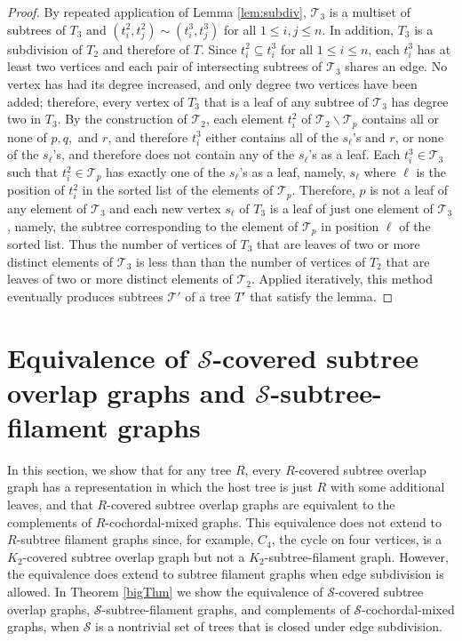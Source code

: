 \documentclass[
final
]{dmtcs-episciences}        \usepackage{graphics, amsthm, amsmath, amssymb, algorithm, algorithmic}
\begin{document}
\begin{proof}
By repeated application of Lemma \ref{lem:subdiv},
$\mathcal T_3$ is a multiset of subtrees of $T_3$ and
$(t^2_i, t^2_j) \sim (t^3_i, t^3_j)$ for all $1 \le i,j \le n$.
In addition,  $T_3$ is a subdivision of $T_2$ and therefore of $T$. Since $t^2_i \subseteq t^3_i$ for all $1 \le i \le n$, each $ t^3_i $ has at least two vertices and each pair of intersecting subtrees of $\mathcal{T}_3$ shares an edge. No vertex has had its degree increased, and only degree two vertices have been added; therefore, every vertex of $T_3$ that is a leaf of any subtree of $ \mathcal{T}_3 $ has degree two in $T_3$. 
By the construction of $\mathcal T_2$, each element $t_i^2$ of $\mathcal T_2 \backslash \mathcal T_p$ contains all or none of $p, q,$ and $r$, and therefore
$t_i^3$ either contains all of the $s_{\ell}$'s and $r$, or none of the $s_{\ell}$'s, and therefore does not contain any of the $s_{\ell}$'s as a leaf.
Each $t_i^3 \in \mathcal T_3$ such that $t_i^2 \in \mathcal T_p$
has exactly one of the $s_{\ell}$'s as a leaf, namely, $s_{\ell}$ where $\ell$ is the position of $t_i^2$ in the sorted list of the elements of $\mathcal T_p$. 
Therefore, $p$ is not a leaf of any element of $ \mathcal{T}_3 $ and each new vertex $s_{\ell}$ of $T_3$ is a leaf of just one element of $ \mathcal{T}_3 $, namely, the subtree corresponding to the element of $\mathcal T_p$ in position $\ell$ of the sorted list. 
Thus the number of vertices of $T_3$ that are leaves of two or more distinct elements of $ \mathcal{T}_3 $ is less than than the number of vertices of $T_2$ that are leaves of two or more distinct elements of $\mathcal{T}_2 $. 
Applied iteratively, this method eventually produces subtrees $\mathcal{T}'$ of a tree $T'$ that satisfy the lemma.
\end{proof}


\section{Equivalence of $\mathcal{S}$-covered subtree overlap graphs and $\mathcal{S}$-subtree-filament graphs}\label{equiv}


In this section, we show that for any tree $R$, 
every $R$-covered subtree overlap graph has a representation in which the host tree is just $R$ with some additional leaves, and that $R$-covered subtree overlap graphs are equivalent to the complements of $R$-cochordal-mixed graphs. This equivalence does not extend to $R$-subtree filament graphs since, for example, 
$C_4$, the cycle on four vertices, is a $K_2$-covered subtree overlap graph but not a $K_2$-subtree-filament graph.
However, the equivalence does extend to subtree filament graphs when edge subdivision is allowed. In Theorem \ref{bigThm}
we show the equivalence of 
$\mathcal{S}$-covered subtree overlap graphs,
$\mathcal{S}$-subtree-filament graphs, and
complements of $\mathcal{S}$-cochordal-mixed graphs, 
when $\mathcal S$ is a nontrivial set of trees that is closed under edge subdivision.
\end{document}
